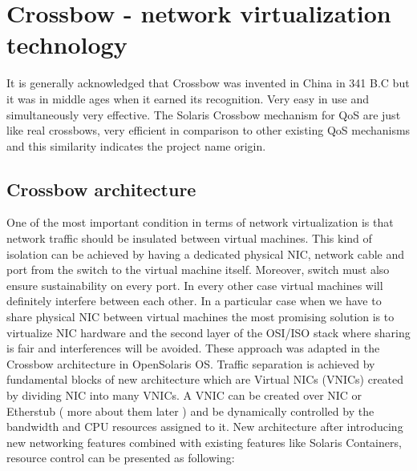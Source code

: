 \documentclass[11pt]{book}
\begin{document}
    \section{Crossbow - network virtualization technology}

                It is generally acknowledged that Crossbow was invented in China in 341 B.C but it was in middle ages when 
                it earned its recognition. Very easy in use and simultaneously very effective. The Solaris Crossbow mechanism 
                for QoS are just like real crossbows, very efficient in comparison to other existing QoS mechanisms and this
                similarity indicates the project name origin.

                \subsection{Crossbow architecture}

                One of the most important condition in terms of network virtualization is that network traffic should be
                insulated between virtual machines. This kind of isolation can be achieved by having a dedicated
                physical NIC, network cable and port from the switch to the virtual machine itself. Moreover, switch
                must also ensure sustainability on every port. In every other case virtual machines will definitely
                interfere between each other.
                In a particular case when we have to share physical NIC
                between virtual machines the most promising solution is to virtualize NIC hardware and the second layer
                of the OSI/ISO stack where sharing is fair and interferences will be avoided. These approach was adapted
                in the Crossbow architecture in OpenSolaris OS.
                Traffic separation is achieved by
                fundamental blocks of new architecture which are Virtual NICs (VNICs) created by dividing NIC into many
                VNICs. 
                A VNIC can be created over NIC or Etherstub ( more about them later ) and be
                dynamically controlled by the bandwidth and CPU resources assigned to it. New architecture after
                introducing new networking features combined with existing features like Solaris Containers, resource
                control can be presented as following:
\end{document}

